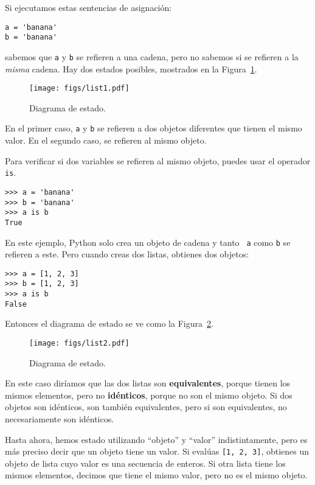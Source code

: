 \documentclass[10pt]{book}
\begin{document}
Si ejecutamos estas sentencias de asignación:

\begin{verbatim}
a = 'banana'
b = 'banana'
\end{verbatim}
%
sabemos que {\tt a} y {\tt b} se refieren a una
cadena, pero no
sabemos si se refieren a la {\em misma} cadena.
Hay dos estados posibles, mostrados en la Figura~\ref{fig.list1}.

\begin{figure}
\centerline
{\texttt{[image: figs/list1.pdf]}}
\caption{Diagrama de estado.}
\label{fig.list1}
\end{figure}

En el primer caso, {\tt a} y {\tt b} se refieren a dos objetos diferentes que
tienen el mismo valor.  En el segundo caso, se refieren al mismo
objeto.

Para verificar si dos variables se refieren al mismo objeto, puedes
usar el operador {\tt is}.

\begin{verbatim}
>>> a = 'banana'
>>> b = 'banana'
>>> a is b
True
\end{verbatim}
%
En este ejemplo, Python solo crea un objeto de cadena y tanto {\tt
  a} como {\tt b} se refieren a este.  Pero cuando creas dos listas, obtienes
dos objetos:

\begin{verbatim}
>>> a = [1, 2, 3]
>>> b = [1, 2, 3]
>>> a is b
False
\end{verbatim}
%
Entonces el diagrama de estado se ve como la Figura~\ref{fig.list2}.

\begin{figure}
\centerline
{\texttt{[image: figs/list2.pdf]}}
\caption{Diagrama de estado.}
\label{fig.list2}
\end{figure}

En este caso diríamos que las dos listas son {\bf equivalentes},
porque tienen los mismos elementos, pero no {\bf idénticos}, porque
no son el mismo objeto.  Si dos objetos son idénticos, son
también equivalentes, pero si son equivalentes, no necesariamente son
idénticos.

Hasta ahora, hemos estado utilizando ``objeto'' y ``valor''
indistintamente, pero es más preciso decir que un objeto tiene un
valor.  Si evalúas {\tt [1, 2, 3]}, obtienes un objeto de
lista cuyo valor es una secuencia de enteros.  Si otra
lista tiene los mismos elementos, decimos que tiene el mismo valor, pero
no es el mismo objeto.
\end{document}
